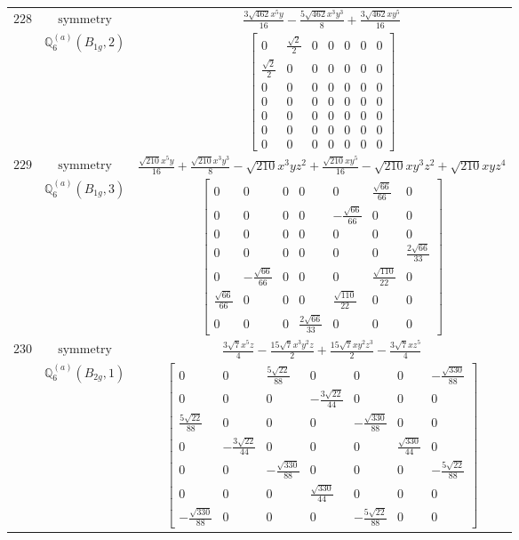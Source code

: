 \documentclass[fleqn,8pt,landscape]{jsarticle}
\begin{document}
\begin{longtable}{ccc}
$ 228 $ & $ \text{symmetry} $ & $ \frac{3 \sqrt{462} x^{5} y}{16} - \frac{5 \sqrt{462} x^{3} y^{3}}{8} + \frac{3 \sqrt{462} x y^{5}}{16} $ \\
$  $ & $ \mathbb{Q}_{6}^{(a)}(B_{1g},2) $ & $ \begin{bmatrix} 0 & \frac{\sqrt{2}}{2} & 0 & 0 & 0 & 0 & 0 \\ \frac{\sqrt{2}}{2} & 0 & 0 & 0 & 0 & 0 & 0 \\ 0 & 0 & 0 & 0 & 0 & 0 & 0 \\ 0 & 0 & 0 & 0 & 0 & 0 & 0 \\ 0 & 0 & 0 & 0 & 0 & 0 & 0 \\ 0 & 0 & 0 & 0 & 0 & 0 & 0 \\ 0 & 0 & 0 & 0 & 0 & 0 & 0 \end{bmatrix} $ \\ \hline
$ 229 $ & $ \text{symmetry} $ & $ \frac{\sqrt{210} x^{5} y}{16} + \frac{\sqrt{210} x^{3} y^{3}}{8} - \sqrt{210} x^{3} y z^{2} + \frac{\sqrt{210} x y^{5}}{16} - \sqrt{210} x y^{3} z^{2} + \sqrt{210} x y z^{4} $ \\
$  $ & $ \mathbb{Q}_{6}^{(a)}(B_{1g},3) $ & $ \begin{bmatrix} 0 & 0 & 0 & 0 & 0 & \frac{\sqrt{66}}{66} & 0 \\ 0 & 0 & 0 & 0 & - \frac{\sqrt{66}}{66} & 0 & 0 \\ 0 & 0 & 0 & 0 & 0 & 0 & 0 \\ 0 & 0 & 0 & 0 & 0 & 0 & \frac{2 \sqrt{66}}{33} \\ 0 & - \frac{\sqrt{66}}{66} & 0 & 0 & 0 & \frac{\sqrt{110}}{22} & 0 \\ \frac{\sqrt{66}}{66} & 0 & 0 & 0 & \frac{\sqrt{110}}{22} & 0 & 0 \\ 0 & 0 & 0 & \frac{2 \sqrt{66}}{33} & 0 & 0 & 0 \end{bmatrix} $ \\ \hline
$ 230 $ & $ \text{symmetry} $ & $ \frac{3 \sqrt{7} x^{5} z}{4} - \frac{15 \sqrt{7} x^{3} y^{2} z}{2} + \frac{15 \sqrt{7} x y^{2} z^{3}}{2} - \frac{3 \sqrt{7} x z^{5}}{4} $ \\
$  $ & $ \mathbb{Q}_{6}^{(a)}(B_{2g},1) $ & $ \begin{bmatrix} 0 & 0 & \frac{5 \sqrt{22}}{88} & 0 & 0 & 0 & - \frac{\sqrt{330}}{88} \\ 0 & 0 & 0 & - \frac{3 \sqrt{22}}{44} & 0 & 0 & 0 \\ \frac{5 \sqrt{22}}{88} & 0 & 0 & 0 & - \frac{\sqrt{330}}{88} & 0 & 0 \\ 0 & - \frac{3 \sqrt{22}}{44} & 0 & 0 & 0 & \frac{\sqrt{330}}{44} & 0 \\ 0 & 0 & - \frac{\sqrt{330}}{88} & 0 & 0 & 0 & - \frac{5 \sqrt{22}}{88} \\ 0 & 0 & 0 & \frac{\sqrt{330}}{44} & 0 & 0 & 0 \\ - \frac{\sqrt{330}}{88} & 0 & 0 & 0 & - \frac{5 \sqrt{22}}{88} & 0 & 0 \end{bmatrix} $ \\ \hline

\end{longtable}
\end{document}
